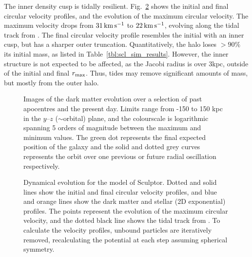 The inner density cusp is tidally resilient.
Fig.~\ref{fig:scl_tidal_track} shows the initial and final circular
velocity profiles, and the evolution of the maximum circular velocity.
The maximum velocity drops from \(31\,{\rm km\,s^{-1}}\) to \(22\,{\rm km\,s^{-1}}\), evolving
along the tidal track from \citet{EN2021}. The final circular velocity
profile resembles the initial with an inner cusp, but has a sharper
outer truncation. Quantitatively, the halo loses \(>90\%\) its initial
mass, as listed in Table~\ref{tbl:scl_sim_results}. However, the inner
structure is not expected to be affected, as the Jacobi radius is over
3kpc, outside of the initial and final \(r_{\rm max}\). Thus, tides may remove
significant amounts of mass, but mostly from the outer halo.

\begin{figure}
\centering
{}
\caption[Sculptor simulation snapshots]{Images of the dark matter
evolution over a selection of past apocentres and the present day.
Limits range from -150 to 150 kpc in the \(y\)--\(z\) (\(\sim\)orbital)
plane, and the colourscale is logarithmic spanning 5 orders of magnitude
between the maximum and minimum values. The green dot represents the
final expected position of the galaxy and the solid and dotted grey
curves represents the orbit over one previous or future radial
oscillation respectively.}\label{fig:scl_sim_images}
\end{figure}

\begin{figure}
\centering
{}
\caption[Sculptor tidal tracks]{Dynamical evolution for the \smallperi{}
model of Sculptor. Dotted and solid lines show the initial and final
circular velocity profiles, and blue and orange lines show the dark
matter and stellar (2D exponential) profiles. The points represent the
evolution of the maximum circular velocity, and the dotted black line
shows the tidal track from \citet{EN2021}. To calculate the velocity
profiles, unbound particles are iteratively removed, recalculating the
potential at each step assuming spherical
symmetry.}\label{fig:scl_tidal_track}
\end{figure}

